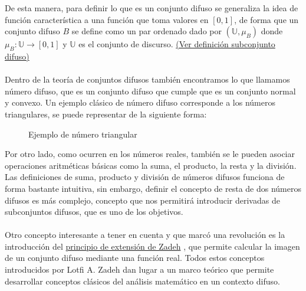 De esta manera, para definir lo que es un conjunto difuso se generaliza la idea de función característica a una función que toma valores en $[0, 1]$, de forma que un conjunto difuso $B$ se define como un par ordenado dado por $(\mathbb{U}, \mu_B)$ donde $\mu_B : \mathbb{U} \longrightarrow [0,1]$ y $\mathbb{U}$ es el conjunto de discurso. \hyperref[def:subconjunto_difuso]{(Ver  definición subconjunto difuso)} \\ \\
Dentro de la teoría de conjuntos difusos también encontramos lo que llamamos número difuso, que es un conjunto difuso que cumple que es un conjunto normal y convexo. Un ejemplo clásico de número difuso corresponde a los números triangulares, se puede representar de la siguiente forma: 
\begin{figure}[H]
	\centering
	\caption{Ejemplo de número triangular}
\end{figure}
Por otro lado, como ocurren en los números reales, también se le pueden asociar operaciones aritméticas básicas como la suma, el producto, la resta y la división. Las definiciones de suma, producto y división de números difusos funciona de forma bastante intuitiva, sin embargo, definir el concepto de resta de dos números difusos es más complejo, concepto que nos permitirá introducir derivadas de subconjuntos difusos, que es uno de los objetivos.
\\ \\
Otro concepto interesante a tener en cuenta y que marcó una revolución es la introducción del \hyperref[def:zadeh]{principio de extensión de Zadeh} \cite{fuzzyintro}, que permite calcular la imagen de un conjunto difuso mediante una función real. Todos estos conceptos introducidos por Lotfi A. Zadeh dan lugar a un marco teórico que permite desarrollar conceptos clásicos del análisis matemático en un contexto difuso.

